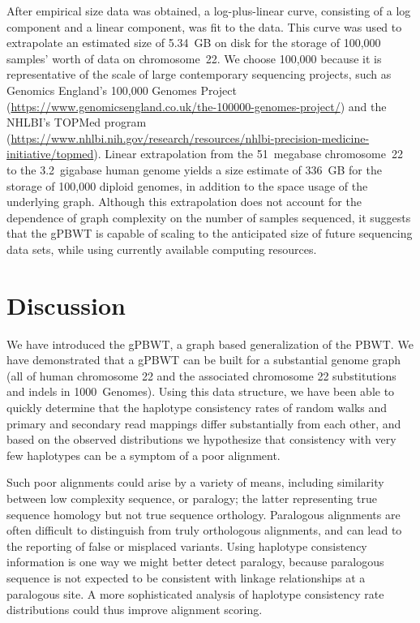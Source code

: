 After empirical size data was obtained, a log-plus-linear curve, consisting of a log component and a linear component, was fit to the data. This curve was used to extrapolate an estimated size of 5.34~GB on disk for the storage of 100,000 samples' worth of data on chromosome~22. We choose 100,000 because it is representative of the scale of large contemporary sequencing projects, such as Genomics England's 100,000 Genomes Project (\url{https://www.genomicsengland.co.uk/the-100000-genomes-project/}) \cite{nothaft2015rethinking} and the NHLBI's TOPMed program (\url{https://www.nhlbi.nih.gov/research/resources/nhlbi-precision-medicine-initiative/topmed}). Linear extrapolation from the 51~megabase chromosome~22 to the 3.2~gigabase human genome yields a size estimate of 336~GB for the storage of 100,000 diploid genomes, in addition to the space usage of the underlying graph. Although this extrapolation does not account for the dependence of graph complexity on the number of samples sequenced, it suggests that the gPBWT is capable of scaling to the anticipated size of future sequencing data sets, while using currently available computing resources.

\section{Discussion}

We have introduced the gPBWT, a graph based generalization of the PBWT. We have demonstrated that a gPBWT can be built for a substantial genome graph (all of human chromosome 22 and the associated chromosome 22 substitutions and indels in 1000~Genomes). Using this data structure, we have been able to quickly determine that the haplotype consistency rates of random walks and primary and secondary read mappings differ substantially from each other, and based on the observed distributions we hypothesize that consistency with very few haplotypes can be a symptom of a poor alignment. 

Such poor alignments could arise by a variety of means, including similarity between low complexity sequence, or paralogy; the latter representing true sequence homology but not true sequence orthology. Paralogous alignments are often difficult to distinguish from truly orthologous alignments, and can lead to the reporting of false or misplaced variants. Using haplotype consistency information is one way we might better detect paralogy, because paralogous sequence is not expected to be consistent with linkage relationships at a paralogous site. A more sophisticated analysis of haplotype consistency rate distributions could thus improve alignment scoring.

